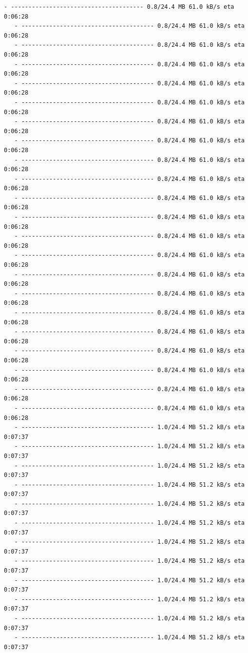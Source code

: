 \documentclass[11pt]{article}
\begin{document}
\begin{Verbatim}[commandchars=\\\{\}]
   - -------------------------------------- 0.8/24.4 MB 61.0 kB/s eta 0:06:28
   - -------------------------------------- 0.8/24.4 MB 61.0 kB/s eta 0:06:28
   - -------------------------------------- 0.8/24.4 MB 61.0 kB/s eta 0:06:28
   - -------------------------------------- 0.8/24.4 MB 61.0 kB/s eta 0:06:28
   - -------------------------------------- 0.8/24.4 MB 61.0 kB/s eta 0:06:28
   - -------------------------------------- 0.8/24.4 MB 61.0 kB/s eta 0:06:28
   - -------------------------------------- 0.8/24.4 MB 61.0 kB/s eta 0:06:28
   - -------------------------------------- 0.8/24.4 MB 61.0 kB/s eta 0:06:28
   - -------------------------------------- 0.8/24.4 MB 61.0 kB/s eta 0:06:28
   - -------------------------------------- 0.8/24.4 MB 61.0 kB/s eta 0:06:28
   - -------------------------------------- 0.8/24.4 MB 61.0 kB/s eta 0:06:28
   - -------------------------------------- 0.8/24.4 MB 61.0 kB/s eta 0:06:28
   - -------------------------------------- 0.8/24.4 MB 61.0 kB/s eta 0:06:28
   - -------------------------------------- 0.8/24.4 MB 61.0 kB/s eta 0:06:28
   - -------------------------------------- 0.8/24.4 MB 61.0 kB/s eta 0:06:28
   - -------------------------------------- 0.8/24.4 MB 61.0 kB/s eta 0:06:28
   - -------------------------------------- 0.8/24.4 MB 61.0 kB/s eta 0:06:28
   - -------------------------------------- 0.8/24.4 MB 61.0 kB/s eta 0:06:28
   - -------------------------------------- 0.8/24.4 MB 61.0 kB/s eta 0:06:28
   - -------------------------------------- 0.8/24.4 MB 61.0 kB/s eta 0:06:28
   - -------------------------------------- 0.8/24.4 MB 61.0 kB/s eta 0:06:28
   - -------------------------------------- 0.8/24.4 MB 61.0 kB/s eta 0:06:28
   - -------------------------------------- 1.0/24.4 MB 51.2 kB/s eta 0:07:37
   - -------------------------------------- 1.0/24.4 MB 51.2 kB/s eta 0:07:37
   - -------------------------------------- 1.0/24.4 MB 51.2 kB/s eta 0:07:37
   - -------------------------------------- 1.0/24.4 MB 51.2 kB/s eta 0:07:37
   - -------------------------------------- 1.0/24.4 MB 51.2 kB/s eta 0:07:37
   - -------------------------------------- 1.0/24.4 MB 51.2 kB/s eta 0:07:37
   - -------------------------------------- 1.0/24.4 MB 51.2 kB/s eta 0:07:37
   - -------------------------------------- 1.0/24.4 MB 51.2 kB/s eta 0:07:37
   - -------------------------------------- 1.0/24.4 MB 51.2 kB/s eta 0:07:37
   - -------------------------------------- 1.0/24.4 MB 51.2 kB/s eta 0:07:37
   - -------------------------------------- 1.0/24.4 MB 51.2 kB/s eta 0:07:37
   - -------------------------------------- 1.0/24.4 MB 51.2 kB/s eta 0:07:37

\end{Verbatim}
\end{document}
